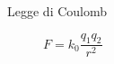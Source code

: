 \documentclass[a4paper,11pt,italian]{article}
\begin{document}
\begin{description}
%
  
  \item[Legge di Coulomb] $ F = k_0 \dfrac{q_1q_2}{r^2} $
  

\end{description}
\end{document}
